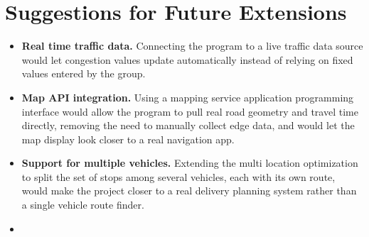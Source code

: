 \section{Suggestions for Future Extensions}

\begin{itemize}[itemsep=2pt]
  \item \textbf{Real time traffic data.} Connecting the program to a live traffic data source would let congestion values update automatically instead of relying on fixed values entered by the group.
  \item \textbf{Map API integration.} Using a mapping service application programming interface would allow the program to pull real road geometry and travel time directly, removing the need to manually collect edge data, and would let the map display look closer to a real navigation app.
  \item \textbf{Support for multiple vehicles.} Extending the multi location optimization to split the set of stops among several vehicles, each with its own route, would make the project closer to a real delivery planning system rather than a single vehicle route finder.
  \item {}
\end{itemize}
